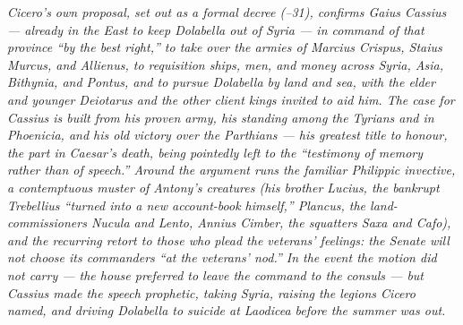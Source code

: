\textit{Cicero's own proposal, set out as a formal decree
(--31), confirms Gaius Cassius --- already in the
East to keep Dolabella out of Syria --- in command of that province
``by the best right,'' to take over the armies of Marcius Crispus,
Staius Murcus, and Allienus, to requisition ships, men, and money
across Syria, Asia, Bithynia, and Pontus, and to pursue Dolabella by
land and sea, with the elder and younger Deiotarus and the other
client kings invited to aid him. The case for Cassius is built from
his proven army, his standing among the Tyrians and in Phoenicia,
and his old victory over the Parthians --- his greatest title to
honour, the part in Caesar's death, being pointedly left to the
``testimony of memory rather than of speech.'' Around the argument
runs the familiar Philippic invective, a contemptuous muster of
Antony's creatures (his brother Lucius, the bankrupt Trebellius
``turned into a new account-book himself,'' Plancus, the
land-commissioners Nucula and Lento, Annius Cimber, the squatters
Saxa and Cafo), and the recurring retort to those who plead the
veterans' feelings: the Senate will not choose its commanders ``at
the veterans' nod.'' In the event the motion did not carry --- the
house preferred to leave the command to the consuls --- but Cassius
made the speech prophetic, taking Syria, raising the legions Cicero
named, and driving Dolabella to suicide at Laodicea before the
summer was out.}
